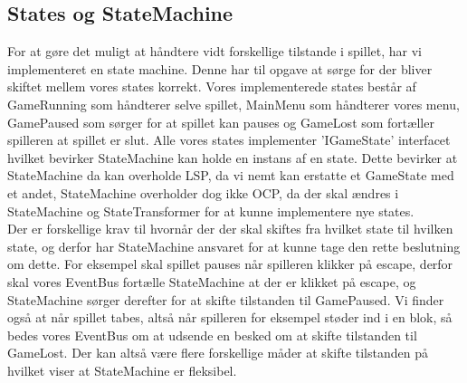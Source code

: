 \subsection{States og StateMachine}
For at gøre det muligt at håndtere vidt forskellige tilstande i spillet, har vi implementeret en state machine. Denne har til opgave at sørge for der bliver skiftet mellem vores states korrekt. Vores implementerede states består af Game\-Running som håndterer selve spillet, MainMenu som håndterer vores menu, Game\-Paused som sørger for at spillet kan pauses og GameLost som fortæller spilleren at spillet er slut. Alle vores states implementer 'IGameState' interfacet hvilket bevirker StateMachine kan holde en instans af en state. Dette bevirker at StateMachine da kan overholde LSP, da vi nemt kan erstatte et GameState med et andet, StateMachine overholder dog ikke OCP, da der skal ændres i StateMachine og StateTransformer for at kunne implementere nye states.\\
Der er forskellige krav til hvornår der der skal skiftes fra hvilket state til hvilken state, og derfor har StateMachine ansvaret for at kunne tage den rette beslutning om dette. For eksempel skal spillet pauses når spilleren klikker på escape, derfor skal vores EventBus fortælle StateMachine at der er klikket på escape, og StateMachine sørger derefter for at skifte tilstanden til GamePaused. Vi finder også at når spillet tabes, altså når spilleren for eksempel støder ind i en blok, så bedes vores EventBus om at udsende en besked om at skifte tilstanden til GameLost. Der kan altså være flere forskellige måder at skifte tilstanden på hvilket viser at StateMachine er fleksibel.

